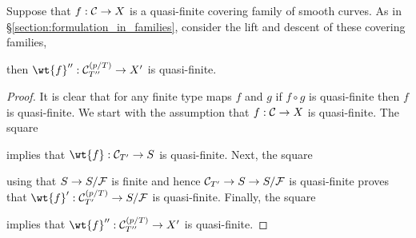 \documentclass[main.tex]{subfiles}
\begin{document}
\begin{lemma} \label{lemma:descent_remains_quasi-finite}
Suppose that $f : \mathcal{C} \to X$ is a quasi-finite covering family of smooth curves. As in \S\ref{section:formulation_in_families}, consider the lift and descent of these covering families,
\begin{center}
\end{center}
then $\wt{f}'' : \cC^{(p/T)}_{T''} \to X'$ is quasi-finite.
\end{lemma}

\begin{proof}
It is clear that for any finite type maps $f$ and $g$ if $f \circ g$ is quasi-finite then $f$ is quasi-finite. We start with the assumption that $f : \mathcal{C} \to X$ is quasi-finite. The square
\begin{center}
\end{center}
implies that $\wt{f} : \cC_{T'} \to S$ is quasi-finite. Next, the square 
\begin{center}
\end{center}
using that $S \to S / \mathcal{F}$ is finite and hence $\mathcal{C}_{T'} \to S \to S / \mathcal{F}$ is quasi-finite proves that $\wt{f}' : \cC^{(p/T)}_{T'} \to S / \F$ is quasi-finite. Finally, the square
\begin{center}
\end{center}
implies that $\wt{f}'' : \cC^{(p/T)}_{T''} \to X'$ is quasi-finite.
\end{proof}
\end{document}
